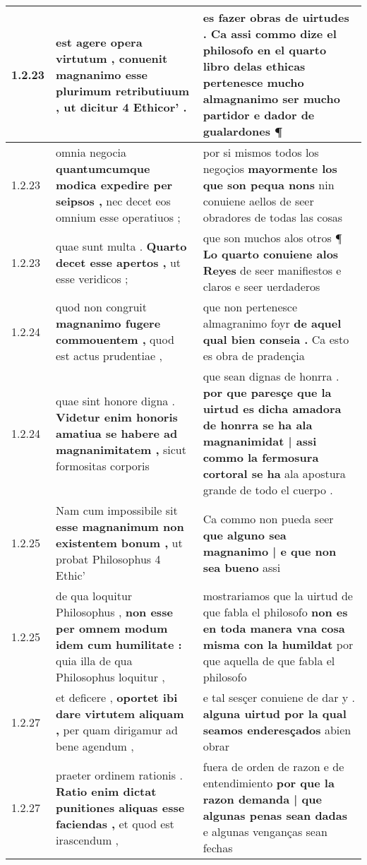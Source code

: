 \begin{tabular}{|p{1cm}|p{6.5cm}|p{6.5cm}|}
1.2.23 & est agere opera virtutum , \textbf{ conuenit magnanimo esse plurimum retributiuum , } ut dicitur 4 Ethicor’ . & es fazer obras de uirtudes . \textbf{ Ca assi commo dize el philosofo en el quarto libro delas ethicas pertenesce mucho } almagnanimo ser mucho partidor e dador de gualardones ¶ \\\hline
1.2.23 & omnia negocia \textbf{ quantumcumque modica expedire per seipsos , } nec decet eos omnium esse operatiuos ; & por si mismos todos los negoçios \textbf{ mayormente los que son pequa nons } nin conuiene aellos de seer obradores de todas las cosas \\\hline
1.2.23 & quae sunt multa . \textbf{ Quarto decet esse apertos , } ut esse veridicos ; & que son muchos alos otros ¶ \textbf{ Lo quarto conuiene alos Reyes } de seer manifiestos e claros e seer uerdaderos \\\hline
1.2.24 & quod non congruit \textbf{ magnanimo fugere commouentem , } quod est actus prudentiae , & que non pertenesce almagranimo foyr \textbf{ de aquel qual bien conseia . } Ca esto es obra de pradençia \\\hline
1.2.24 & quae sint honore digna . \textbf{ Videtur enim honoris amatiua se habere ad magnanimitatem , } sicut formositas corporis & que sean dignas de honrra . \textbf{ por que paresçe que la uirtud es dicha amadora de honrra se ha ala magnanimidat | assi commo la fermosura cortoral se ha } ala apostura grande de todo el cuerpo . \\\hline
1.2.25 & Nam cum impossibile sit \textbf{ esse magnanimum non existentem bonum , } ut probat Philosophus 4 Ethic’ & Ca commo non pueda seer \textbf{ que alguno sea magnanimo | e que non sea bueno } assi \\\hline
1.2.25 & de qua loquitur Philosophus , \textbf{ non esse per omnem modum idem cum humilitate : } quia illa de qua Philosophus loquitur , & mostrariamos que la uirtud de que fabla el philosofo \textbf{ non es en toda manera vna cosa misma con la humildat } por que aquella de que fabla el philosofo \\\hline
1.2.27 & et deficere , \textbf{ oportet ibi dare virtutem aliquam , } per quam dirigamur ad bene agendum , & e tal sesçer conuiene de dar y . \textbf{ alguna uirtud por la qual seamos enderesçados } abien obrar \\\hline
1.2.27 & praeter ordinem rationis . \textbf{ Ratio enim dictat punitiones aliquas esse faciendas , } et quod est irascendum , & fuera de orden de razon e de entendimiento \textbf{ por que la razon demanda | que algunas penas sean dadas } e algunas venganças sean fechas \\\hline

\end{tabular}
